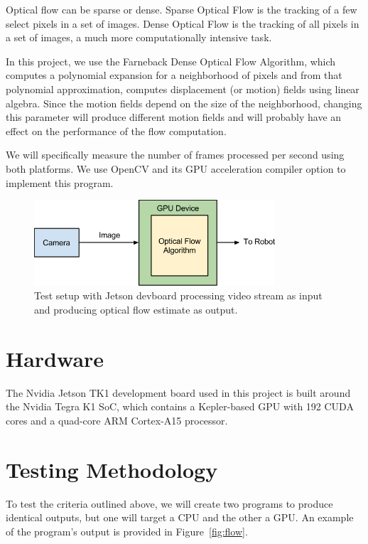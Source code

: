 \documentclass[12pt,letterpaper]{article}
\begin{document}
Optical flow can be sparse or dense. Sparse Optical Flow is the tracking of
a few select pixels in a set of images. Dense Optical Flow is the tracking of
all pixels in a set of images, a much more computationally intensive task.

In this project, we use the Farneback Dense Optical Flow Algorithm, which
computes a polynomial expansion for a neighborhood of pixels and from that
polynomial approximation, computes displacement (or motion) fields using linear
algebra. Since the motion fields depend on the size of the neighborhood,
changing this parameter will produce different motion fields and will probably
have an effect on the performance of the flow computation.

We will specifically measure the number of frames processed per second using
both platforms. We use OpenCV and its GPU acceleration compiler option to 
implement this program.

\begin{figure}[H]
  \centering
  \includegraphics[width=0.8\textwidth]{img/sys.png}
  \caption{Test setup with Jetson devboard processing video stream as input and producing optical flow estimate as output.}
  \label{fig:sys}
\end{figure}

\section{Hardware}
The Nvidia Jetson TK1 development board used in this project is built around
the Nvidia Tegra K1 SoC, which contains a Kepler-based GPU with 192 CUDA cores
and a quad-core ARM Cortex-A15 processor.

\section{Testing Methodology}
To test the criteria outlined above, we will create two programs to produce
identical outputs, but one will target a CPU and the other a GPU. An example of
the program's output is provided in Figure~\ref{fig:flow}.
\end{document}
